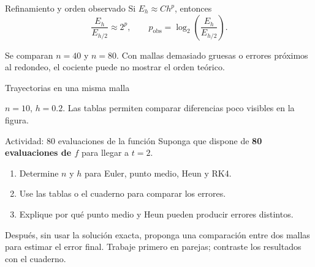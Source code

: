 \documentclass[aspectratio=169,12pt]{beamer}
\newcommand{\datos}{datos/edo}
\begin{document}
\begin{frame}{Refinamiento y orden observado}
Si $E_h\approx Ch^p$, entonces
\[\frac{E_h}{E_{h/2}}\approx2^p,\qquad
p_{\mathrm{obs}}=\log_2\!\left(\frac{E_h}{E_{h/2}}\right).\]
\begin{center}\end{center}
\small Se comparan $n=40$ y $n=80$.
Con mallas demasiado gruesas o errores próximos al redondeo, el cociente puede no mostrar el orden teórico.
\end{frame}

\begin{frame}{Trayectorias en una misma malla}
\begin{center}
\end{center}
\small $n=10$, $h=0.2$. Las tablas permiten comparar diferencias poco visibles en la figura.
\end{frame}

\begin{frame}{Actividad: 80 evaluaciones de la función}
Suponga que dispone de \textbf{80 evaluaciones de $f$} para llegar a $t=2$.
\begin{enumerate}
\item Determine $n$ y $h$ para Euler, punto medio, Heun y RK4.
\item Use las tablas o el cuaderno para comparar los errores.
\item Explique por qué punto medio y Heun pueden producir errores distintos.
\end{enumerate}
\medskip
Después, sin usar la solución exacta, proponga una comparación entre dos mallas para estimar el error final.
\medskip
\small Trabaje primero en parejas; contraste los resultados con el cuaderno.
\end{frame}
\end{document}
